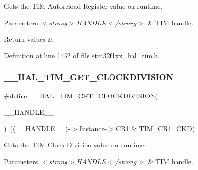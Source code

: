 Gets the T\+IM Autoreload Register value on runtime. 


\begin{DoxyParams}{Parameters}
{\em $<$strong$>$\+H\+A\+N\+D\+L\+E$<$/strong$>$} & T\+IM handle. \\
\hline
\end{DoxyParams}

\begin{DoxyRetVals}{Return values}
{\em } & \\
\hline
\end{DoxyRetVals}


Definition at line 1452 of file stm32f1xx\+\_\+hal\+\_\+tim.\+h.

\mbox{\label{group___t_i_m___exported___macros_gae6bc91bb5940bce52828c690f24001b8}} 
\subsubsection{\texorpdfstring{\+\_\+\+\_\+\+H\+A\+L\+\_\+\+T\+I\+M\+\_\+\+G\+E\+T\+\_\+\+C\+L\+O\+C\+K\+D\+I\+V\+I\+S\+I\+ON}{\_\_HAL\_TIM\_GET\_CLOCKDIVISION}}
{\footnotesize\ttfamily \#define \+\_\+\+\_\+\+H\+A\+L\+\_\+\+T\+I\+M\+\_\+\+G\+E\+T\+\_\+\+C\+L\+O\+C\+K\+D\+I\+V\+I\+S\+I\+ON(\begin{DoxyParamCaption}\item[{}]{\+\_\+\+\_\+\+H\+A\+N\+D\+L\+E\+\_\+\+\_\+ }\end{DoxyParamCaption})~((\+\_\+\+\_\+\+H\+A\+N\+D\+L\+E\+\_\+\+\_\+)-\/$>$Instance-\/$>$C\+R1 \& T\+I\+M\+\_\+\+C\+R1\+\_\+\+C\+KD)}



Gets the T\+IM Clock Division value on runtime. 


\begin{DoxyParams}{Parameters}
{\em $<$strong$>$\+H\+A\+N\+D\+L\+E$<$/strong$>$} & T\+IM handle. \\
\hline
\end{DoxyParams}

